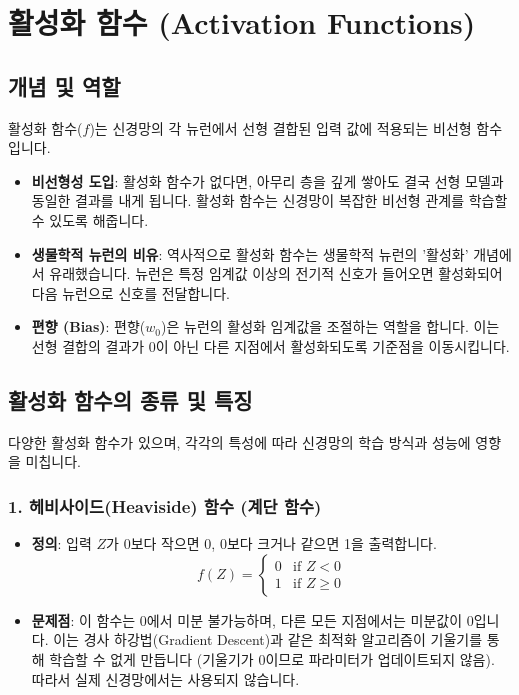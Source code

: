 \documentclass[11pt,a4paper]{article}
\theoremstyle{definition}
\begin{document}
\newpage
\section*{활성화 함수 (Activation Functions)}

\subsection*{개념 및 역할}
활성화 함수($f$)는 신경망의 각 뉴런에서 선형 결합된 입력 값에 적용되는 비선형 함수입니다.
\begin{itemize}
    \item \textbf{비선형성 도입}: 활성화 함수가 없다면, 아무리 층을 깊게 쌓아도 결국 선형 모델과 동일한 결과를 내게 됩니다. 활성화 함수는 신경망이 복잡한 비선형 관계를 학습할 수 있도록 해줍니다.
    \item \textbf{생물학적 뉴런의 비유}: 역사적으로 활성화 함수는 생물학적 뉴런의 '활성화' 개념에서 유래했습니다. 뉴런은 특정 임계값 이상의 전기적 신호가 들어오면 활성화되어 다음 뉴런으로 신호를 전달합니다.
    \item \textbf{편향 (Bias)}: 편향($w_0$)은 뉴런의 활성화 임계값을 조절하는 역할을 합니다. 이는 선형 결합의 결과가 0이 아닌 다른 지점에서 활성화되도록 기준점을 이동시킵니다.
\end{itemize}

\subsection*{활성화 함수의 종류 및 특징}
다양한 활성화 함수가 있으며, 각각의 특성에 따라 신경망의 학습 방식과 성능에 영향을 미칩니다.

\subsubsection*{1. 헤비사이드(Heaviside) 함수 (계단 함수)}
\begin{itemize}
    \item \textbf{정의}: 입력 $Z$가 0보다 작으면 0, 0보다 크거나 같으면 1을 출력합니다.
    \[ f(Z) = \begin{cases} 0 & \text{if } Z < 0 \\ 1 & \text{if } Z \ge 0 \end{cases} \]
    \item \textbf{문제점}: 이 함수는 0에서 미분 불가능하며, 다른 모든 지점에서는 미분값이 0입니다. 이는 경사 하강법(Gradient Descent)과 같은 최적화 알고리즘이 기울기를 통해 학습할 수 없게 만듭니다 (기울기가 0이므로 파라미터가 업데이트되지 않음). 따라서 실제 신경망에서는 사용되지 않습니다.
\end{itemize}
\end{document}
